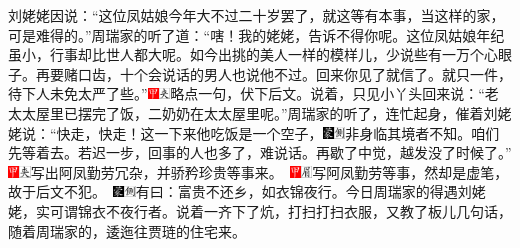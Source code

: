 刘姥姥因说：“这位凤姑娘今年大不过二十岁罢了，就这等有本事，当这样的家，可是难得的。”周瑞家的听了道：“嗐！我的姥姥，告诉不得你呢。这位凤姑娘年纪虽小，行事却比世人都大呢。如今出挑的美人一样的模样儿，少说些有一万个心眼子。再要赌口齿，十个会说话的男人也说他不过。回来你见了就信了。就只一件，待下人未免太严了些。”{\includegraphics[width=3mm]{../Images/00002}\includegraphics[width=3mm]{../Images/00012}\footnotesize \kaishu 略点一句，伏下后文。}说着，只见小丫头回来说：“老太太屋里已摆完了饭，二奶奶在太太屋里呢。”周瑞家的听了，连忙起身，催着刘姥姥说：“快走，快走！这一下来他吃饭是一个空子，{\includegraphics[width=3mm]{../Images/00006}\includegraphics[width=3mm]{../Images/00011}\footnotesize \kaishu 非身临其境者不知。}咱们先等着去。若迟一步，回事的人也多了，难说话。再歇了中觉，越发没了时候了。”{{\includegraphics[width=3mm]{../Images/00002}\includegraphics[width=3mm]{../Images/00012}\footnotesize \kaishu 写出阿凤勤劳冗杂，并骄矜珍贵等事来。　\includegraphics[width=3mm]{../Images/00002}\includegraphics[width=3mm]{../Images/00010}\footnotesize \kaishu 写阿凤勤劳等事，然却是虚笔，故于后文不犯。　}\includegraphics[width=3mm]{../Images/00006}\includegraphics[width=3mm]{../Images/00011}\footnotesize \kaishu 有曰：富贵不还乡，如衣锦夜行。今日周瑞家的得遇刘姥姥，实可谓锦衣不夜行者。}说着一齐下了炕，打扫打扫衣服，又教了板儿几句话，随着周瑞家的，逶迤往贾琏的住宅来。

